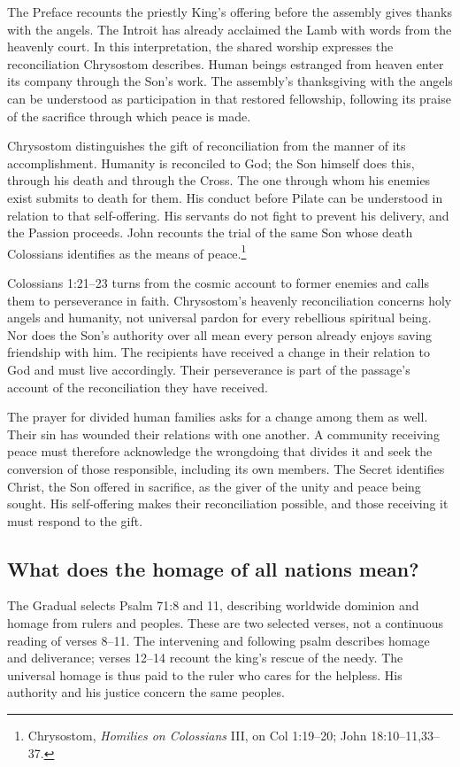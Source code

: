 The Preface recounts the priestly King's offering before the assembly gives thanks with the angels. The Introit has already acclaimed the Lamb with words from the heavenly court. In this interpretation, the shared worship expresses the reconciliation Chrysostom describes. Human beings estranged from heaven enter its company through the Son's work. The assembly's thanksgiving with the angels can be understood as participation in that restored fellowship, following its praise of the sacrifice through which peace is made.

Chrysostom distinguishes the gift of reconciliation from the manner of its accomplishment. Humanity is reconciled to God; the Son himself does this, through his death and through the Cross. The one through whom his enemies exist submits to death for them. His conduct before Pilate can be understood in relation to that self-offering. His servants do not fight to prevent his delivery, and the Passion proceeds. John recounts the trial of the same Son whose death Colossians identifies as the means of peace.\footnote{Chrysostom, \emph{Homilies on Colossians} III, on Col 1:19--20; John 18:10--11,33--37.}

Colossians 1:21--23 turns from the cosmic account to former enemies and calls them to perseverance in faith. Chrysostom's heavenly reconciliation concerns holy angels and humanity, not universal pardon for every rebellious spiritual being. Nor does the Son's authority over all mean every person already enjoys saving friendship with him. The recipients have received a change in their relation to God and must live accordingly. Their perseverance is part of the passage's account of the reconciliation they have received.

The prayer for divided human families asks for a change among them as well. Their sin has wounded their relations with one another. A community receiving peace must therefore acknowledge the wrongdoing that divides it and seek the conversion of those responsible, including its own members. The Secret identifies Christ, the Son offered in sacrifice, as the giver of the unity and peace being sought. His self-offering makes their reconciliation possible, and those receiving it must respond to the gift.

\subsection{What does the homage of all nations mean?}
The Gradual selects Psalm 71:8 and 11, describing worldwide dominion and homage from rulers and peoples. These are two selected verses, not a continuous reading of verses 8--11. The intervening and following psalm describes homage and deliverance; verses 12--14 recount the king's rescue of the needy. The universal homage is thus paid to the ruler who cares for the helpless. His authority and his justice concern the same peoples.

